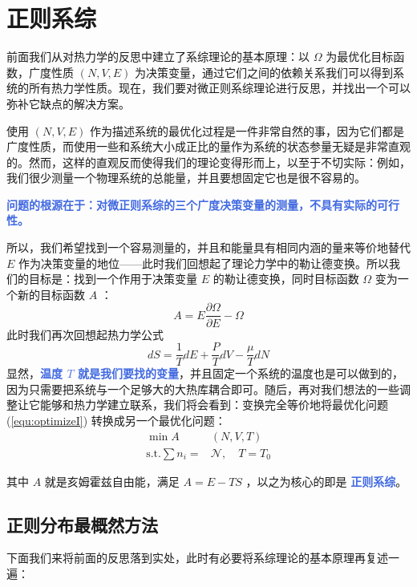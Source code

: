 
\chapter{正则系综}\label{cha:正则系综}

前面我们从对热力学的反思中建立了系综理论的基本原理：以 $\Omega$ 为最优化目标函数，广度性质 $(N,V,E)$ 为决策变量，通过它们之间的依赖关系我们可以得到系统的所有热力学性质。现在，我们要对微正则系综理论进行反思，并找出一个可以弥补它缺点的解决方案。

使用 $(N,V,E)$ 作为描述系统的最优化过程是一件非常自然的事，因为它们都是广度性质，而使用一些和系统大小成正比的量作为系统的状态参量无疑是非常直观的。然而，这样的直观反而使得我们的理论变得形而上，以至于不切实际：例如，我们很少测量一个物理系统的总能量，并且要想固定它也是很不容易的。

\textcolor{RoyalBlue}{\textbf{\kaishu 问题的根源在于：对微正则系综的三个广度决策变量的测量，不具有实际的可行性。}}  

所以，我们希望找到一个容易测量的，并且和能量具有相同内涵的量来等价地替代 $E$ 作为决策变量的地位——此时我们回想起了理论力学中的勒让德变换。所以我们的目标是：找到一个作用于决策变量 $E$ 的勒让德变换，同时目标函数 $\Omega$ 变为一个新的目标函数 $A$ ：
\[
    A = E\frac{\partial \Omega}{\partial E} - \Omega
\]
此时我们再次回想起热力学公式
\[
    dS = \frac{1}{T} dE + \frac{P}{T} dV - \frac{\mu}{T} dN
\]
显然，\textcolor{RoyalBlue}{\textbf{\kaishu 温度 $T$ 就是我们要找的变量}}，并且固定一个系统的温度也是可以做到的，因为只需要把系统与一个足够大的大热库耦合即可。随后，再对我们想法的一些调整让它能够和热力学建立联系，我们将会看到：变换完全等价地将最优化问题 (\ref*{equ:optimizeI}) 转换成另一个最优化问题：
\begin{equation}\label{equ:optimizeII}
    \begin{split}
        \min A&(N,V,T)\\
        \text{s.t.}\sum n_i = &\mathcal{N},\quad T = T_0
    \end{split}
\end{equation}

其中 $A$ 就是亥姆霍兹自由能，满足 $A = E - TS$ ，以之为核心的即是 \textcolor{RoyalBlue}{\textbf{\kaishu 正则系综}}。

\section{正则分布最概然方法}\label{sec:正则分布的最概然方法}

下面我们来将前面的反思落到实处，此时有必要将系综理论的基本原理再复述一遍：

